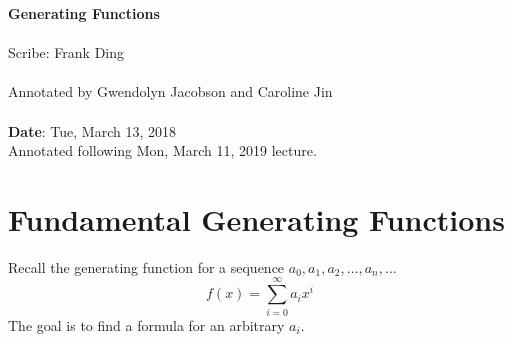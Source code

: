 \documentclass[11pt,twosided]{article}
\def\titlestring{Generating Functions}
\def\scribestring{Frank Ding \\ \\ Annotated by Gwendolyn Jacobson and Caroline Jin}
\def\datestring{Tue, March 13, 2018 \\ Annotated following Mon, March 11, 2019 lecture.}
\begin{document}
\thispagestyle{plain}  %

\noindent
{\LARGE \textbf{\titlestring}}\\\\
%
{\Large Scribe: \scribestring}\\ \\
{\textbf{Date}: \datestring}


\noindent

\section{Fundamental Generating Functions}
Recall the generating function for a sequence $a_0, a_1, a_2, \dots, a_n, \dots$
\[
f(x) = \sum_{i=0}^{\infty} a_i x^i
\]
The goal is to find a formula for an arbitrary $a_i$. \\
\end{document}

